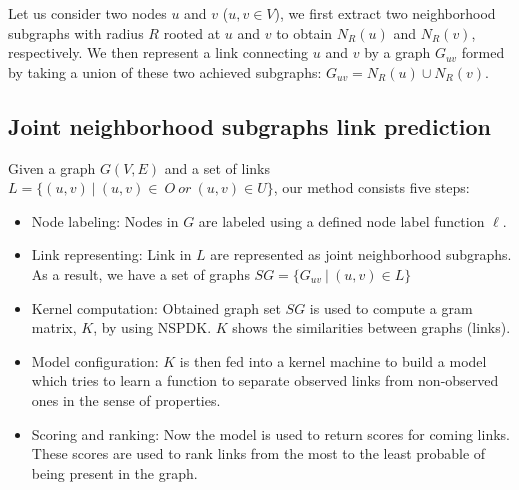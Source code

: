 \documentclass[runningheads,a4paper]{llncs}
\begin{document}
Let us consider two nodes $u$ and $v$ ($u, v \in V$), we first extract two neighborhood subgraphs with radius $R$ rooted at $u$ and $v$ to obtain $N_R(u)$ and $N_R(v)$, respectively. We then represent a link connecting $u$ and $v$ by a graph $G_{uv}$ formed by taking a union of these two achieved subgraphs: $G_{uv}= N_R(u) \cup N_R(v)$.
\subsection{Joint neighborhood subgraphs link prediction}
Given a graph $G(V,E)$ and a set of links $L = \lbrace(u,v)\ |\ (u,v)\in\ O\ or\ (u,v)\in U \rbrace$, our method consists five steps:
\begin{itemize}
	\item Node labeling: Nodes in $G$ are labeled using a defined node label function $\ell$.
	\item Link representing: Link in $L$ are represented as joint neighborhood subgraphs. As a result, we have a set of graphs $SG = \lbrace G_{uv}\ |\ (u,v) \in L \rbrace$
	\item Kernel computation: Obtained graph set $SG$ is used to compute a gram matrix, $K$, by using NSPDK. $K$ shows the similarities between graphs (links).
	\item Model configuration: $K$ is then fed into a kernel machine to build a model which tries to learn a function to separate observed links from non-observed ones in the sense of properties.
	\item Scoring and ranking: Now the model is used to return scores for coming links. These scores are used to rank links from the most to the least probable of being present in the graph.
\end{itemize}
\end{document}
